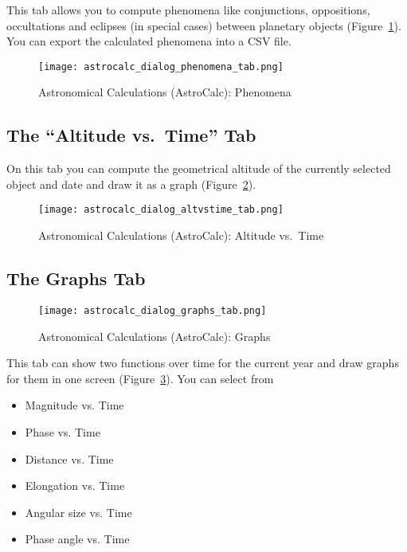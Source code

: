 This tab allows you to compute phenomena like conjunctions, oppositions, 
occultations and eclipses (in special cases) between planetary objects 
(Figure~\ref{fig:gui:AstroCalc:Phenomena}). 
You can export the calculated phenomena into a CSV file.

\begin{figure}[htbp]
\centering\texttt{[image: astrocalc\_dialog\_phenomena\_tab.png]}
\caption{Astronomical Calculations (AstroCalc): Phenomena}
\label{fig:gui:AstroCalc:Phenomena}
\end{figure}


\subsection{The ``Altitude vs.\ Time'' Tab}
\label{sec:gui:AstroCalc:AltVsTime}
  
On this tab you can compute the geometrical altitude of the currently selected object 
and date and draw it as a graph (Figure~\ref{fig:gui:AstroCalc:AltVsTime}).
    
\begin{figure}[htbp]
\centering\texttt{[image: astrocalc\_dialog\_altvstime\_tab.png]}
\caption{Astronomical Calculations (AstroCalc): Altitude vs.\ Time}
\label{fig:gui:AstroCalc:AltVsTime}
\end{figure}

\newpage
\subsection{The Graphs Tab}
\label{sec:gui:AstroCalc:Graphs}
    
\begin{figure}[htbp]
\centering\texttt{[image: astrocalc\_dialog\_graphs\_tab.png]}
\caption{Astronomical Calculations (AstroCalc): Graphs}
\label{fig:gui:AstroCalc:Graphs}
\end{figure}
  
\noindent{}This tab can show two functions over time for the current year and draw graphs for them in one screen (Figure~\ref{fig:gui:AstroCalc:Graphs}). 
You can select from 
\begin{itemize}
\item Magnitude vs. Time
\item Phase vs. Time
\item Distance vs. Time 
\item Elongation vs. Time 
\item Angular size vs. Time
\item Phase angle vs. Time
\end{itemize}

